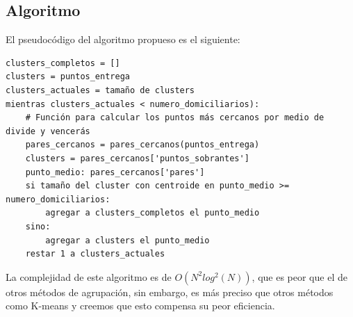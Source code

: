 \documentclass[runningheads]{llncs}
\begin{document}
\subsection{Algoritmo}
El pseudocódigo del algoritmo propueso es el siguiente:
\begin{verbatim}
clusters_completos = []
clusters = puntos_entrega
clusters_actuales = tamaño de clusters
mientras clusters_actuales < numero_domiciliarios):
    # Función para calcular los puntos más cercanos por medio de divide y vencerás
    pares_cercanos = pares_cercanos(puntos_entrega)
    clusters = pares_cercanos['puntos_sobrantes'] 
    punto_medio: pares_cercanos['pares']
    si tamaño del cluster con centroide en punto_medio >= numero_domiciliarios:
        agregar a clusters_completos el punto_medio
    sino:
        agregar a clusters el punto_medio
    restar 1 a clusters_actuales
\end{verbatim}
La complejidad de este algoritmo es de $O(N^2log^2(N))$, que es peor que el de otros métodos
de agrupación, sin embargo, es más preciso que otros métodos como K-means \cite{nazari19} y
creemos que esto compensa su peor eficiencia.
\end{document}
